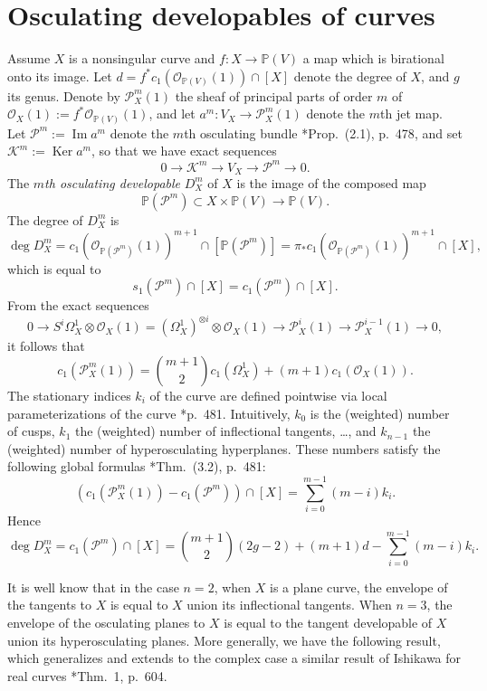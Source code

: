 \documentclass[reqno]{amsart}
\theoremstyle{definition}
\theoremstyle{remark}
\DeclareMathOperator{\Ker}{Ker}
\DeclareMathOperator{\Image}{Im}
\begin{document}
\section{Osculating developables of curves}\label{osccurves}
Assume $X$ is a nonsingular curve and $f\colon X\to \mathbb P(V)$ a map which is birational onto its image. Let $d=f^*c_1(\mathcal O_{\mathbb P(V)}(1))\cap [X]$ denote the degree of $X$, and $g$ its genus. 
Denote by $\mathcal P^m_X(1)$ the sheaf of principal parts of order $m$ of $\mathcal O_X(1):=f^*\mathcal O_{\mathbb P(V)}(1)$, and let $a^m\colon V_X\to \mathcal P^m_X(1)$ denote the $m$th jet map. Let $\mathcal P^m:=\Image a^m$ denote the $m$th osculating bundle \cite{numchar}*{Prop.~(2.1), p.~478}, and set $\mathcal K^m:=\Ker a^m$, so that we have exact sequences
\[0\to \mathcal K^m \to V_X \to \mathcal P^m\to 0.\]
 The \emph{$m$th  osculating developable} $D^m_X$ of $X$ is the image of the composed map
\[\mathbb P(\mathcal P^m)\subset X\times \mathbb P(V)\to \mathbb P(V).\]
The degree of $D_X^m$ is
\[\deg D^m_X=c_1(\mathcal O_{\mathbb P(\mathcal P^m)}(1))^{m+1}\cap [\mathbb P(\mathcal P^m)]
=\pi_*c_1(\mathcal O_{\mathbb P(\mathcal P^m)}(1))^{m+1} \cap [X],\]
which is equal to 
\[s_1(\mathcal P^m)\cap [X]=c_1(\mathcal P^m)\cap [X].\]
From the exact sequences
\[0\to S^i \Omega^1_X \otimes \mathcal O_X(1)=(\Omega^1_X)^{\otimes i} \otimes \mathcal O_X(1) \to \mathcal P^i_X(1) \to \mathcal P^{i-1}_X(1)\to 0,\]
it follows that
\[ \textstyle c_1(\mathcal P^m_X(1))= \binom{m+1}2 c_1(\Omega^1_X)+(m+1)c_1(\mathcal O_X(1)).\]
The stationary indices $k_i$ of the curve are defined pointwise via local parameterizations of the curve \cite{numchar}*{p.~481}. Intuitively, $k_0$ is the (weighted) number of cusps, $k_1$ the (weighted) number of inflectional tangents, \dots, and $k_{n-1}$ the (weighted) number of hyperosculating hyperplanes. These numbers satisfy the following global formulas \cite{numchar}*{Thm.~(3.2), p.~481}:
\[ \textstyle (c_1(\mathcal P^m_X(1))-c_1(\mathcal P^m))\cap [X]=\sum_{i=0}^{m-1} (m-i)k_i.\]
Hence
\[ \textstyle \deg D^m_X=c_1(\mathcal P^m)\cap [X]= \binom{m+1}2 (2g-2) +(m+1)d  -\sum_{i=0}^{m-1}(m-i)k_i.\]


It is well know that in the case $n=2$, when $X$ is a plane curve, the envelope of the tangents to $X$ is equal to $X$ union its inflectional tangents. When $n=3$, the envelope of the osculating planes to $X$ is equal to the tangent developable of $X$ union its hyperosculating planes. More generally, we have the following result, which generalizes and extends to the complex case a similar result of Ishikawa for real curves \cite{Ishikawa}*{Thm.~1, p.~604}.
\end{document}
